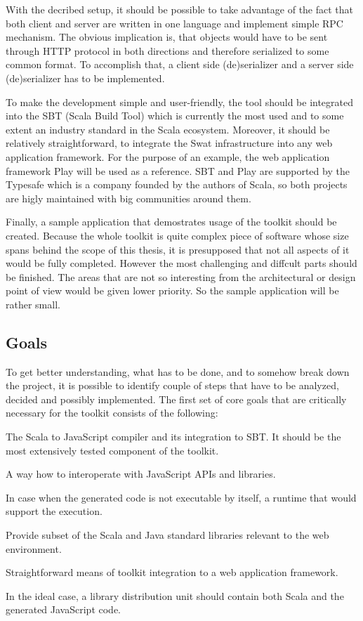 \documentclass[12pt,a4paper]{report}
\begin{document}
With the decribed setup, it should be possible to take advantage of the fact that both client and server are written in one language and implement simple RPC mechanism. The obvious implication is, that objects would have to be sent through HTTP protocol in both directions and therefore serialized to some common format. To accomplish that, a client side (de)serializer and a server side (de)serializer has to be implemented.

To make the development simple and user-friendly, the tool should be integrated into the SBT (Scala Build Tool\cite{Sbt}) which is currently the most used and to some extent an industry standard in the Scala ecosystem. Moreover, it should be relatively straightforward, to integrate the Swat infrastructure into any web application framework. For the purpose of an example, the web application framework Play\cite{Play} will be used as a reference. SBT and Play are supported by the Typesafe\cite{Typesafe} which is a company founded by the authors of Scala, so both projects are higly maintained with big communities around them.

Finally, a sample application that demostrates usage of the toolkit should be created. Because the whole toolkit is quite complex piece of software whose size spans behind the scope of this thesis, it is presupposed that not all aspects of it would be fully completed. However the most challenging and diffcult parts should be finished. The areas that are not so interesting from the architectural or design point of view would be given lower priority. So the sample application will be rather small.

\subsection{Goals}

To get better understanding, what has to be done, and to somehow break down the project, it is possible to identify couple of steps that have to be analyzed, decided and possibly implemented. The first set of core goals that are critically necessary for the toolkit consists of the following:

\begin{description}[style=multiline,leftmargin=5cm]
\item[1 - Compiler] The Scala to JavaScript compiler and its integration to SBT. It should be the most extensively tested component of the toolkit.
\item[2 - Interoperation] A way how to interoperate with JavaScript APIs and libraries.
\item[3 - Runtime] In case when the generated code is not executable by itself, a runtime that would support the execution.
\item[4 - Libraries] Provide subset of the Scala and Java standard libraries relevant to the web environment.
\item[5 - Integration] Straightforward means of toolkit integration to a web application framework.
\item[6 - Distribution] In the ideal case, a library distribution unit should contain both Scala and the generated JavaScript code.
\end{description}
\end{document}

